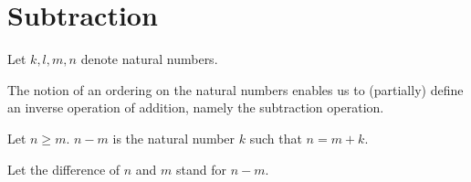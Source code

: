 \documentclass[../../arithmetic.ftl.tex]{subfiles}
\begin{document}
  \begin{comment}
    \begin{forthel}

    \end{forthel}
  \end{comment}


  \section{Subtraction}

  \begin{forthel}
  \end{forthel}

  \begin{forthel}
  \end{forthel}

  \begin{forthel}
    Let $k, l, m, n$ denote natural numbers.
  \end{forthel}

  The notion of an ordering on the natural numbers enables us to (partially)
  define an inverse operation of addition, namely the subtraction operation.

  \begin{forthel}
    \begin{definition}
      Let $n \geq m$.
      $n - m$ is the natural number $k$ such that $n = m + k$.
    \end{definition}

    Let the difference of $n$ and $m$ stand for $n - m$.
  \end{forthel}
\end{document}
